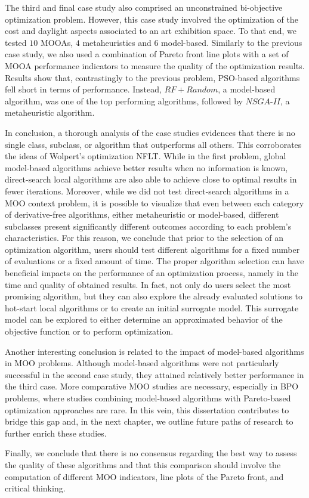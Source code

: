 The third and final case study also comprised an unconstrained bi-objective optimization problem. However, this case study involved the optimization of the cost and daylight aspects associated to an art exhibition space. To that end, we tested $10$ \acp{MOOA}, $4$ metaheuristics and $6$ model-based. Similarly to the previous case study, we also used a combination of Pareto front line plots with a set of \ac{MOOA} performance indicators to measure the quality of the optimization results. Results show that, contrastingly to the previous problem, \ac{PSO}-based algorithms fell short in terms of performance. Instead, $RF+Random$, a model-based algorithm, was one of the top performing algorithms, followed by $NSGA$-$II$, a metaheuristic algorithm. 

In conclusion, a thorough analysis of the case studies evidences that there is no single class, subclass, or algorithm that outperforms all others. This corroborates the ideas of Wolpert's optimization \ac{NFLT}\cite{Wolpert1997NFLT}. While in the first problem, global model-based algorithms achieve better results when no information is known, direct-search local algorithms are also able to achieve close to optimal results in fewer iterations. Moreover, while we did not test direct-search algorithms in a \ac{MOO} context problem, it is possible to visualize that even between each category of derivative-free algorithms, either metaheuristic or model-based, different subclasses present significantly different outcomes according to each problem's characteristics. For this reason, we conclude that prior to the selection of an optimization algorithm, users should test different algorithms for a fixed number of evaluations or a fixed amount of time. The proper algorithm selection can have beneficial impacts on the performance of an optimization process, namely in the time and quality of obtained results. In fact, not only do users select the most promising algorithm, but they can also explore the already evaluated solutions to hot-start local algorithms or to create an initial surrogate model. This surrogate model can be explored to either determine an approximated behavior of the objective function or to perform optimization. 

Another interesting conclusion is related to the impact of model-based algorithms in \ac{MOO} problems. Although model-based algorithms were not particularly successful in the second case study, they attained relatively better performance in the third case. More comparative \ac{MOO} studies are necessary, especially in \ac{BPO} problems, where studies combining model-based algorithms with Pareto-based optimization approaches are rare. In this vein, this dissertation contributes to bridge this gap and, in the next chapter, we outline future paths of research to further enrich these studies.

Finally, we conclude that there is no consensus regarding the best way to assess the quality of these algorithms and that this comparison should involve the computation of different \ac{MOO} indicators, line plots of the Pareto front, and critical thinking. 